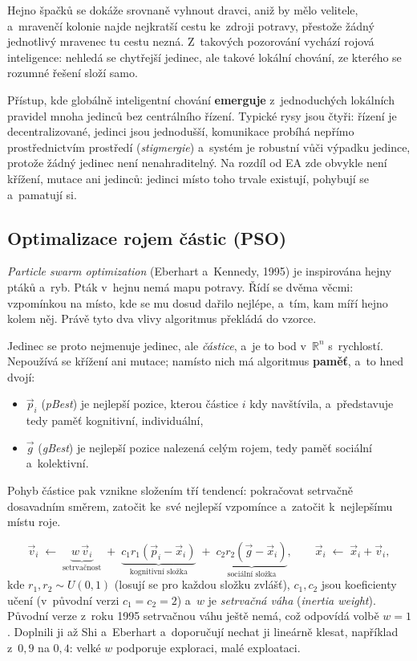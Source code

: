 \documentclass[11pt,a4paper]{article}
\theoremstyle{definition}
\begin{document}
Hejno špačků se dokáže srovnaně vyhnout dravci, aniž by mělo velitele, a~mravenčí kolonie
najde nejkratší cestu ke~zdroji potravy, přestože žádný jednotlivý mravenec tu cestu nezná.
Z~takových pozorování vychází rojová inteligence: nehledá se chytřejší jedinec, ale takové
lokální chování, ze kterého se rozumné řešení složí samo.

\begin{defbox}
Přístup, kde globálně inteligentní chování \textbf{emerguje} z~jednoduchých
lokálních pravidel mnoha jedinců bez centrálního řízení. Typické rysy jsou čtyři: řízení je
decentralizované, jedinci jsou jednodušší, komunikace probíhá nepřímo prostřednictvím
prostředí (\emph{stigmergie}) a~systém je robustní vůči výpadku jedince, protože žádný
jedinec není nenahraditelný. Na rozdíl od EA zde obvykle není křížení, mutace ani 
jedinců: jedinci místo toho trvale existují, pohybují se a~pamatují si.
\end{defbox}

\subsection{Optimalizace rojem částic (PSO)}

\emph{Particle swarm optimization} (Eberhart a~Kennedy, 1995) je inspirována hejny ptáků
a~ryb. Pták v~hejnu nemá mapu potravy. Řídí se dvěma věcmi: vzpomínkou na místo, kde se mu
dosud dařilo nejlépe, a~tím, kam míří hejno kolem něj. Právě tyto dva vlivy algoritmus
překládá do vzorce.

Jedinec se proto nejmenuje jedinec, ale \emph{částice}, a~je to bod v~$\mathbb{R}^n$
s~rychlostí. Nepoužívá se křížení ani mutace; namísto nich má algoritmus \textbf{paměť},
a~to hned dvojí:
\begin{itemize}
\item $\vec p_i$ (\emph{pBest}) je nejlepší pozice, kterou částice $i$ kdy navštívila,
  a~představuje tedy paměť kognitivní, individuální,
\item $\vec g$ (\emph{gBest}) je nejlepší pozice nalezená celým rojem, tedy paměť sociální
  a~kolektivní.
\end{itemize}

Pohyb částice pak vznikne složením tří tendencí: pokračovat setrvačně dosavadním směrem,
zatočit ke~své nejlepší vzpomínce a~zatočit k~nejlepšímu místu roje.

\begin{defbox}
\[
\vec v_i \;\gets\; \underbrace{w\,\vec v_i}_{\text{setrvačnost}}
\;+\; \underbrace{c_1 r_1 (\vec p_i - \vec x_i)}_{\text{kognitivní složka}}
\;+\; \underbrace{c_2 r_2 (\vec g - \vec x_i)}_{\text{sociální složka}},
\qquad
\vec x_i \;\gets\; \vec x_i + \vec v_i ,
\]
kde $r_1, r_2 \sim U(0,1)$ (losují se pro každou složku zvlášť),
$c_1, c_2$ jsou koeficienty učení (v~původní verzi $c_1 = c_2 = 2$)
a~$w$ je \emph{setrvačná váha} (\emph{inertia weight}).
Původní verze z~roku 1995 setrvačnou váhu ještě nemá, což odpovídá volbě $w = 1$. Doplnili ji
až Shi a~Eberhart a~doporučují nechat ji lineárně klesat, například z~$0{,}9$ na $0{,}4$:
velké $w$ podporuje exploraci, malé exploataci.
\end{defbox}
\end{document}

